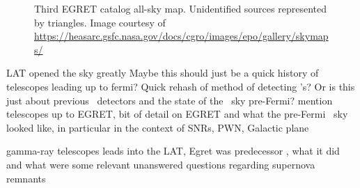 \begin{figure}[h!]%
	\centering
	\caption[Third EGRET catalog all-sky map.]{Third EGRET catalog all-sky map. Unidentified sources represented by triangles. Image courtesy of \url{https://heasarc.gsfc.nasa.gov/docs/cgro/images/epo/gallery/skymaps/}}
	\label{fig:3EGSky} 
\end{figure}

 LAT opened the sky greatly
Maybe this should just be a quick history of \gam{} telescopes leading up to fermi?
Quick rehash of method of detecting \gam's? Or is this just about previous \gam ~detectors and the state of the \gam~sky pre-Fermi?  mention telescopes up to EGRET, bit of detail on EGRET and what the pre-Fermi \gam~sky looked like, in particular in the context of SNRs, PWN, Galactic plane

gamma-ray telescopes leads into the LAT, Egret was  predecessor , what it did and what were some relevant unanswered questions regarding supernova remnants 


